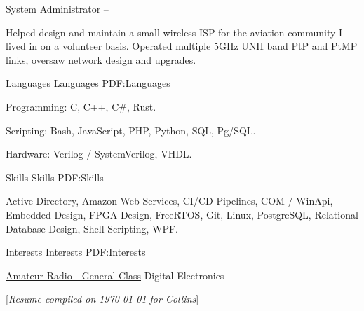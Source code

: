 \documentclass[letterpaper,MMMyyyy,nonstopmode]{simpleresumecv}
\newcommand{\CVNote}{Resume compiled on {\today} for Collins}
\begin{document}
\begin{Body}
System Administrator
\hfill
{} -- 
\begin{Detail}
\BulletItem
Helped design and maintain a small wireless ISP for the
aviation community I lived in on a volunteer basis.
\BulletItem
Operated multiple 5GHz UNII band PtP and PtMP links, oversaw network
design and upgrades.
\end{Detail}



\Section
{Languages}
{Languages}
{PDF:Languages}

\BulletItem
Programming:
C,
C++,
C\#,
Rust.

\Gap
\BulletItem
Scripting: Bash, JavaScript, PHP, Python, SQL, Pg/SQL.

\BulletItem
Hardware: Verilog / SystemVerilog,
VHDL.


\Section
{Skills}
{Skills}
{PDF:Skills}

\Entry
Active Directory,
Amazon Web Services,
CI/CD Pipelines,
COM / WinApi,
Embedded Design,
FPGA Design,
FreeRTOS,
Git,
Linux,
PostgreSQL,
Relational Database Design,
Shell Scripting,
WPF.



\Section
{Interests}
{Interests}
{PDF:Interests}

\Entry
\href{https://wireless2.fcc.gov/UlsApp/UlsSearch/license.jsp?licKey=3209531}{Amateur Radio - General Class}
\newline
Digital Electronics

\end{Body}


\BigGap
\UseNoteFont%
\null\hfill%
[\textit{\CVNote}]
\end{document}
